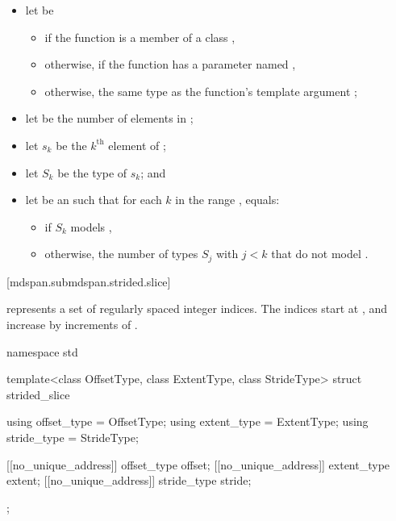 \begin{itemize}
\item let  be
  \begin{itemize}
  \item
  if the function is a member of a class ,
  \item
  otherwise,
  if the function has a parameter named ,
  \item
  otherwise,
  the same type as the function's template argument ;
  \end{itemize}
\item let  be the number of elements in ;
\item let $s_k$ be the $k^\text{th}$ element of ;
\item let $S_k$ be the type of $s_k$; and
\item let  be an  such that
for each $k$ in the range ,
 equals:
  \begin{itemize}
  \item
  if $S_k$ models ,
  \item
  otherwise,
  the number of types $S_j$ with $j < k$ that
  do not model .
  \end{itemize}
\end{itemize}

[mdspan.submdspan.strided.slice]{}

\pnum
{} represents a set of
 regularly spaced integer indices.
The indices start at , and
increase by increments of .

%
\begin{codeblock}
namespace std {
  template<class OffsetType, class ExtentType, class StrideType>
  struct strided_slice {
    using offset_type = OffsetType;
    using extent_type = ExtentType;
    using stride_type = StrideType;

    [[no_unique_address]] offset_type offset{};
    [[no_unique_address]] extent_type extent{};
    [[no_unique_address]] stride_type stride{};
  };
}
\end{codeblock}

